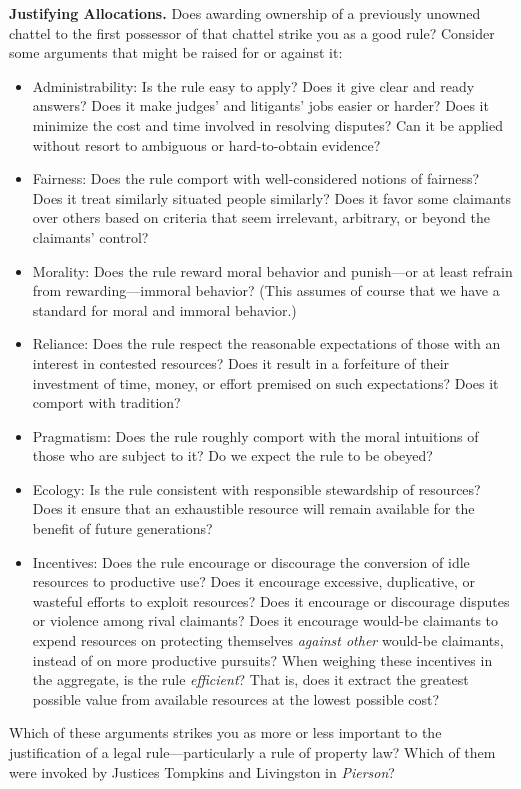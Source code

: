 
\item \textbf{Justifying Allocations.} \label{pierson-justify}Does awarding
ownership of a previously unowned chattel to the first possessor of that chattel
strike you as a good rule? Consider some arguments that might be raised for or
against it:
\begin{itemize}
\item Administrability: Is the rule easy to apply? Does it give clear and ready
answers? Does it make judges' and litigants' jobs easier or harder? Does it
minimize the cost and time involved in resolving disputes? Can it be applied
without resort to ambiguous or hard-to-obtain evidence?
\item Fairness: Does the rule comport with well-considered notions of fairness?
Does it treat similarly situated people similarly? Does it favor some claimants
over others based on criteria that seem irrelevant, arbitrary, or beyond the
claimants' control?
\item Morality: Does the rule reward moral behavior and punish---or at least
refrain from rewarding---immoral behavior? (This assumes of course that we have
a standard for moral and immoral behavior.)
\item Reliance: Does the rule respect the reasonable expectations of those with
an interest in contested resources? Does it result in a forfeiture of their
investment of time, money, or effort premised on such expectations? Does it
comport with tradition?
\item Pragmatism: Does the rule roughly comport with the moral intuitions of
those who are subject to it? Do we expect the rule to be obeyed?
\item Ecology: Is the rule consistent with responsible stewardship of resources?
Does it ensure that an exhaustible resource will remain available for the
benefit of future generations?
\item Incentives: Does the rule encourage or discourage the conversion of idle
resources to productive use? Does it encourage excessive, duplicative, or
wasteful efforts to exploit resources? Does it encourage or discourage disputes
or violence among rival claimants? Does it encourage would-be claimants to
expend resources on protecting themselves \textit{against other} would-be
claimants, instead of on more productive pursuits? When weighing these
incentives in the aggregate, is the rule \textit{efficient}? That is, does it
extract the greatest possible value from available resources at the lowest
possible cost?
\end{itemize}
Which of these arguments strikes you as more or less important to the
justification of a legal rule---particularly a rule of property law? Which of
them were invoked by Justices Tompkins and Livingston in \textit{Pierson}? 

